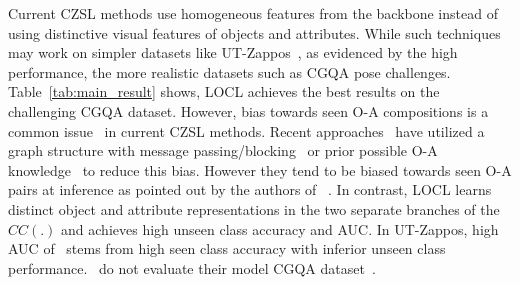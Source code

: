 \documentclass{bmvc2k}
\begin{document}
Current CZSL methods use homogeneous features from the backbone instead of using distinctive visual features of objects and attributes. While such techniques may work on simpler datasets like UT-Zappos~\cite{yu2017semantic}, as evidenced by the high performance, the more realistic datasets such as CGQA pose challenges. 
Table~\ref{tab:main_result} shows, LOCL achieves the best results on the challenging CGQA dataset. 
However, bias towards seen O-A compositions is a common issue~\cite{purushwalkam2019task} in current CZSL methods. Recent approaches~\cite{xu2021relation, naeem2021learning} have utilized a graph structure with message passing/blocking~\cite{xu2021relation} or prior possible O-A knowledge~\cite{naeem2021learning} to reduce this bias. 
However they tend to be biased towards seen O-A pairs at inference as pointed out by the authors of ~\cite{xu2021relation}.
In contrast, LOCL learns distinct object and attribute representations in the two separate branches of the $CC(.)$ and achieves high unseen class accuracy and AUC.
In UT-Zappos, high AUC of~\cite{xu2021relation} stems from high seen class accuracy with inferior unseen class performance.~\cite{xu2021relation} do not evaluate their model CGQA dataset~\cite{naeem2021learning}.
\end{document}
